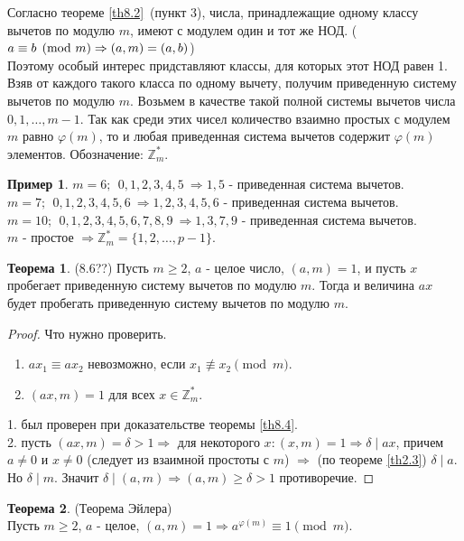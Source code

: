 \documentclass[a4paper, 12pt]{article}
\newcommand{\Z}{\mathbb{Z}}
\renewcommand{\phi}{\varphi}
\renewcommand{\div}{\mid}
\theoremstyle{definition}
\newtheorem{theorem}{Теорема}[section]
\newtheorem*{example}{Пример}
\begin{document}
    Согласно теореме \ref{th8.2}\ (пункт 3), числа, принадлежащие одному классу вычетов по модулю $m$, имеют с модулем один и тот же НОД. ($a\equiv b \pmod{m}\\
    \Rightarrow (a,m)=(a,b)$)\\
    Поэтому особый интерес придставляют классы, для которых этот НОД равен 1. Взяв от каждого такого класса по одному вычету, получим приведенную систему вычетов по модулю $m$. Возьмем в качестве такой полной системы вычетов числа $0,1,\dots, m-1$. Так как среди этих чисел количество взаимно простых с модулем $m$ равно $\phi(m)$, то и любая приведенная система вычетов содержит $\phi(m)$ элементов. Обозначение: $\Z_m^*$.
    \begin{example}
        $m=6;\ \ 0,1,2,3,4,5\ \Rightarrow 1,5$ - приведенная система вычетов.\\
        $m=7;\ \ 0,1,2,3,4,5,6\ \Rightarrow 1,2,3,4,5,6$ - приведенная система вычетов.\\
        $m=10;\ \ 0,1,2,3,4,5,6,7,8,9\ \Rightarrow 1,3,7,9$ - приведенная система вычетов.\\
        $m$ - простое $\Rightarrow \Z_m^*=\{1,2,\dots, p-1\}$.
    \end{example}
    \begin{theorem}\label{th8.5} (8.6??)
        Пусть $m\geq 2$, $a$ - целое число, $(a,m)=1$, и пусть $x$ пробегает приведенную систему вычетов по модулю $m$. Тогда и величина $ax$ будет пробегать приведенную систему вычетов по модулю $m$.  
    \end{theorem} 
    \begin{proof}
        Что нужно проверить.
        \begin{enumerate}
            \item $ax_1\equiv ax_2$ невозможно, если $x_1\not\equiv x_2\pmod{m}$.
            \item $(ax,m)=1$ для всех $x\in \Z_m^*$.
        \end{enumerate}
        1. был проверен при доказательстве теоремы \ref{th8.4}.\\
        2. пусть $(ax,m)=\delta>1 \Rightarrow$ для некоторого $x: (x,m)=1\Rightarrow \delta \div ax$, причем $a\ne 0$ и $x\ne 0$ (следует из взаимной простоты с $m$) $\Rightarrow$ (по теореме \ref{th2.3}) $\delta \div a$. Но $\delta \div m$. Значит $\delta \div (a,m)\Rightarrow (a,m)\geq \delta>1$ противоречие.
    \end{proof} 
    \begin{theorem}\label{th8.6} (Теорема Эйлера)\\
        Пусть $m\geq 2$, $a$ - целое, $(a,m)=1\Rightarrow a^{\phi(m)}\equiv 1\pmod{m}$.
    \end{theorem} 
\end{document}
